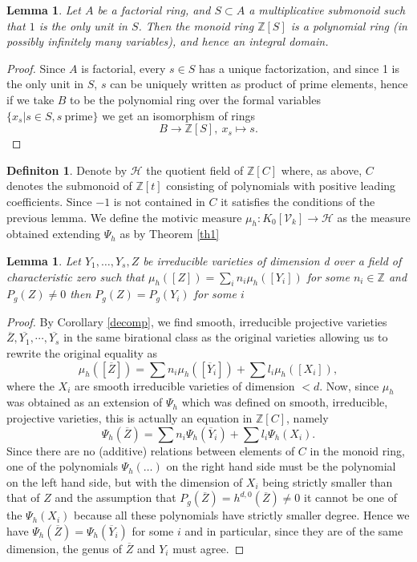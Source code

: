 \documentclass[11pt, a4paper, german]{article}
\theoremstyle{plain}
\newtheorem{lemma}[theorem]{Lemma}
\theoremstyle{definition}
\newtheorem{definition}[theorem]{Definiton}
\newcommand{\gring}[1][k]{K_0[\mathcal{V}_#1]}
\begin{document}
\begin{lemma}
    Let $A$ be a factorial ring, and $S \subset A$ a multiplicative submonoid such that $1$ is the only unit in $S$. Then the monoid ring
    $\mathbb{Z}[S]$ is a polynomial ring (in possibly infinitely many variables), and hence an integral domain.
\end{lemma}
\begin{proof}
    Since $A$ is factorial, every $s \in S$ has a unique factorization, and since 1 is the only unit in $S$, 
    $s$ can be uniquely written as product of prime elements, hence if we take $B$ to be the polynomial ring over the formal
    variables $\{x_s | s \in S, s\ \text{prime}\}$ we get an isomorphism of rings
    \[
        B \to \mathbb{Z}[S], \ x_s \mapsto s.
    \]
\end{proof}

\begin{definition}
    Denote by $\mathcal{H}$ the quotient field of $\mathbb{Z}[C]$ where, as above, $C$ denotes the submonoid of $\mathbb{Z}[t]$ 
    consisting of polynomials with positive leading coefficients. Since $-1$ is not contained in $C$ it satisfies the conditions of the
    previous lemma.
    We define the motivic measure $\mu_h \colon \gring \to \mathcal{H}$ as the measure obtained extending $\Psi_h$ as by Theorem \ref{th1}
\end{definition}

\begin{lemma}
    \label{same}
    Let $Y_1,\dots,Y_s,Z$ be irreducible varieties of dimension d over a field of characteristic zero 
    such that $\mu_h([Z]) = \sum_i n_i \mu_h([Y_i])$ for some $n_i \in \mathbb{Z}$ and $P_g(Z) \neq 0$ then $P_g(Z) = P_g(Y_i)$ for some $i$
\end{lemma}
\begin{proof}
    By Corollary \ref{decomp}, we find smooth, irreducible projective varieties $\overline{Z},\overline{Y_1},\cdots, \overline{Y_s}$ in the same
    birational class as the original varieties allowing us to rewrite the original equality as 
    \[
        \mu_h([\overline{Z}]) = \sum n_i\mu_h([\overline{Y}_i]) + \sum l_i \mu_h([X_i]),
    \]
    where the $X_i$ are smooth irreducible varieties of dimension $<d$.
    Now, since $\mu_h$ was obtained as an extension of $\Psi_h$ which was defined on smooth, irreducible, projective varieties, this is
    actually an equation in $\mathbb{Z}[C]$, namely
    \[
        \Psi_h(\overline{Z}) = \sum n_i \Psi_h(\overline{Y}_i) + \sum l_i\Psi_h(X_i).
    \]
    Since there are no (additive) relations between elements of $C$ in the monoid ring, one of the polynomials $\Psi_h(\dots)$ on the 
    right hand side must be the polynomial on the left hand side, but with the dimension of 
    $X_i$ being strictly smaller than that of $Z$ and the assumption that
    $P_g(\overline{Z}) = h^{d,0}(\overline{Z}) \neq 0$ it cannot be one of the $\Psi_h(X_i)$ because all these polynomials have strictly smaller
    degree. Hence we have $\Psi_h(\overline{Z}) = \Psi_h(\overline{Y}_i)$ for some $i$ and in particular, since they are of the same dimension, 
    the genus of $\overline{Z}$ and $Y_i$ must agree.
\end{proof}
\end{document}
